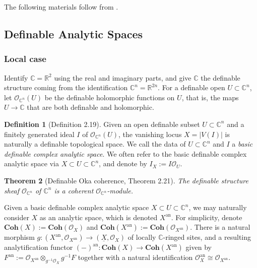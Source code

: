 \documentclass{amsart}
\newtheorem{theorem}{Theorem}[subsection]
\theoremstyle{definition}
\newtheorem{definition}[theorem]{Definition}
\numberwithin{equation}{section}
\newcommand{\analytic}{\mathrm{an}}
\begin{document}
The following materials follow from \cite{zbMATH07662555}.

\subsection{Definable Analytic Spaces}
\subsubsection{Local case}
Identify $\mathbb{C} = \mathbb{R}^2$ using the real and imaginary parts,
and give $\mathbb{C}$ the definable structure coming from the identification $\mathbb{C}^n = \mathbb{R}^{2n}$.
For a definable open $U \subset \mathbb{C}^n$,
let $\mathcal{O}_{\mathbb{C}^n}(U)$ be the definable holomorphic functions on $U$,
that is, the maps $U \to \mathbb{C}$ that are both definable and holomorphic.

\begin{definition}[Definition 2.19]
    Given an open definable subset $U \subset \mathbb{C}^n$ and 
    a finitely generated ideal $I$ of $\mathcal{O}_{\mathbb{C}^n}(U)$,
    the vanishing locus $X = |V(I)|$ is naturally a definable topological space.
    We call the data of $U \subset \mathbb{C}^n$ and $I$ a \emph{basic definable complex analytic space}.
    We often refer to the basic definable complex analytic space via $X \subset U \subset \mathbb{C}^n$,
    and denote by $I_X := I\mathcal{O}_U$.
\end{definition}

\begin{theorem}[Definable Oka coherence, Theorem 2.21]
    The definable structure sheaf $\mathcal{O}_{\mathbb{C}^n}$ of $\mathbb{C}^n$ is a coherent $\mathcal{O}_{\mathbb{C}^n}$-module.
\end{theorem}

Given a basic definable complex analytic space $X \subset U \subset \mathbb{C}^n$,
we may naturally consider $X$ as an analytic space,
which is denoted $X^{\analytic}$.
For simplicity, denote $\mathbf{Coh}(X) := \mathbf{Coh}(\mathcal{O}_X)$ and $\mathbf{Coh}(X^{\analytic}) := \mathbf{Coh}(\mathcal{O}_{X^{\analytic}})$.
There is a natural morphism $g: (X^{\analytic},\mathcal{O}_{X^{\analytic}}) \to (\underline{X},\mathcal{O}_X)$ of locally $\mathbb{C}$-ringed sites,
and a resulting analytification functor $(-)^{\analytic}: \mathbf{Coh}(X) \to \mathbf{Coh}(X^{\analytic})$ given by $F^{\analytic} := \mathcal{O}_{X^{\analytic}} \otimes_{g^{-1}\mathcal{O}_X} g^{-1}F$ together with a natural identification $\mathcal{O}_X^{\analytic} \cong \mathcal{O}_{X^{\analytic}}$.
\end{document}
